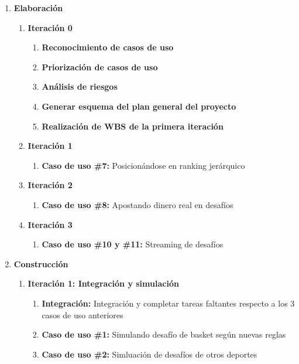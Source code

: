 \begin{enumerate}
  \item \Large{\textbf{Elaboración}}
  \begin{enumerate}
    \item \large{\textbf{Iteración 0}}
    \begin{enumerate}
      \item \normalsize{\textbf{Reconocimiento de casos de uso}}
      \item \normalsize{\textbf{Priorización de casos de uso}}
      \item \normalsize{\textbf{Análisis de riesgos}}
      \item \normalsize{\textbf{Generar esquema del plan general del proyecto}}
      \item \normalsize{\textbf{Realización de WBS de la primera iteración}}
    \end{enumerate}
    \item \large{\textbf{Iteración 1}}
    \begin{enumerate}
      \item \normalsize{\textbf{Caso de uso \#7:} Posicionándose en ranking jerárquico}
    \end{enumerate}
    \item \large{\textbf{Iteración 2}}
    \begin{enumerate}
      \item \normalsize{\textbf{Caso de uso \#8:} Apostando dinero real en desafíos}
    \end{enumerate}
    \item \large{\textbf{Iteración 3}}
    \begin{enumerate}
      \item \normalsize{\textbf{Caso de uso \#10 y \#11:} Streaming de desafíos}
    \end{enumerate}
  \end{enumerate}
  \item \Large{\textbf{Construcción}}
  \begin{enumerate}
    \item \large{\textbf{Iteración 1: Integración y simulación}}
    \begin{enumerate}
      \item \normalsize{\textbf{Integración:} Integración y completar tareas faltantes respecto a los 3 casos de uso anteriores}
      \item \normalsize{\textbf{Caso de uso \#1:} Simulando desafío de basket según nuevas reglas}
      \item \normalsize{\textbf{Caso de uso \#2:} Simluación de desafíos de otros deportes}

\end{enumerate}
\end{enumerate}
\end{enumerate}
